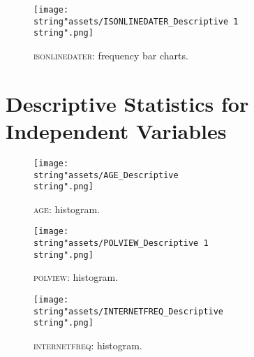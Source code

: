 \vspace*{\fill}
\begin{figure}[H]
\begin{centering}
\texttt{[image: \\string"assets/ISONLINEDATER\_Descriptive 1\\string".png]}
\par\end{centering}
\centering{}\caption{\textsc{isonlinedater}: frequency bar charts.\label{fig:isonlinedater:-frequency-bar}}
\end{figure}
\vspace*{\fill}\clearpage{}

\section{Descriptive Statistics for Independent Variables}

\begin{figure}[H]
\begin{centering}
\texttt{[image: \\string"assets/AGE\_Descriptive\\string".png]}
\par\end{centering}
\begin{centering}
\caption{\textsc{age}: histogram.\label{fig:age:-histogram.}}
\par\end{centering}
\end{figure}

\begin{figure}[H]
\begin{centering}
\texttt{[image: \\string"assets/POLVIEW\_Descriptive 1\\string".png]}
\par\end{centering}
\centering{}\caption{\textsc{polview}: histogram.\label{fig:polview-histogram}}
\end{figure}
\clearpage{}

\vspace*{\fill}
\begin{figure}[H]
\begin{centering}
\texttt{[image: \\string"assets/INTERNETFREQ\_Descriptive\\string".png]}
\par\end{centering}
\centering{}\caption{\textsc{internetfreq}: histogram.\label{fig:internetfreq-histogram}}
\end{figure}
\vspace*{\fill}

